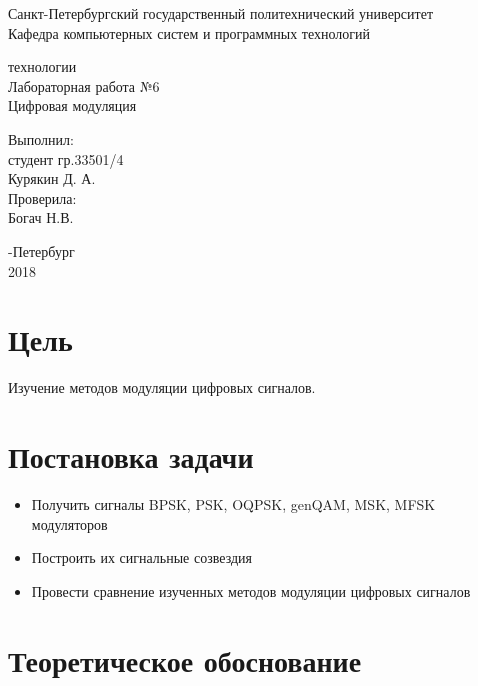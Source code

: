 \documentclass[a4paper,12pt]{article}
\begin{document}
\begin{center}
Санкт-Петербургский государственный политехнический университет
\\Кафедра компьютерных систем и программных технологий
\end{center}
\vspace*{10em plus .6em minus .5em}

\begin{center}
{ технологии
\\Лабораторная работа №6
\\Цифровая модуляция}
\end{center}

\vspace*{5em plus .6em minus .5em}
\begin{flushright}
Выполнил:\\студент гр.33501/4\\Курякин Д. А.\\Проверила:\\Богач Н.В.
\end{flushright}

\vspace*{15em plus .6em minus .5em}
\begin{center}
{-Петербург
\\2018}
\end{center}
\pagestyle{empty}
\newpage
\pagestyle{plain}

\section{Цель}

Изучение методов модуляции цифровых сигналов.

\section{Постановка задачи}

\begin{itemize}
\item Получить сигналы BPSK, PSK, OQPSK, genQAM, MSK, MFSK
модуляторов
\item Построить их сигнальные созвездия
\item Провести сравнение изученных методов модуляции цифровых
сигналов
\end{itemize}

\section{Теоретическое обоснование}
\end{document}
